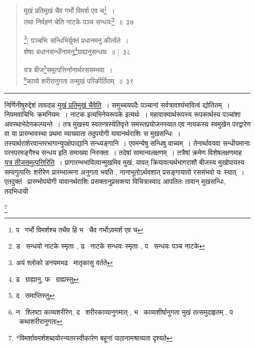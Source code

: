 \documentclass[11pt, openany]{book}
\newcommand\blfootnote[1]{%
 \begingroup
 \renewcommand\thefootnote{}\footnote{#1}%
 \addtocounter{footnote}{-1}%
 \endgroup
}
\begin{document}
\newpage

\begin{quote}
{\na मुखं प्रतिमुखं चैव गर्भो विमर्श एव च\renewcommand{\thefootnote}{1}\footnote{प \textendash\ गर्भो विमर्शश्च तथैव हि भ \textendash\ चैव गर्भोऽवमर्श एव च}~।\\
तथा निर्वहणं चेति नाटके पञ्च सन्धयः\renewcommand{\thefootnote}{2}\footnote{ड \textendash\ सन्धयो नाटके स्मृताः , ढ \textendash\ नाटके सन्धयः स्मृताः , प \textendash\ सन्धयः पञ्च नाटके}~॥~३७

\renewcommand{\thefootnote}{3}\footnote{अयं श्लोको डनयमभढ \textendash\ मातृकासु वर्तते}[ पञ्चभिः सन्धिभिर्युक्तं प्रधानमनु कीर्त्यते~।\\
शेषाः प्रधानसन्धीनामनु\renewcommand{\thefootnote}{4}\footnote{ढ \textendash\ ग्राह्यानु, फ \textendash\ ग्राह्यस्तु}ग्राह्यनुसन्धयः~॥ ]~३८

यत्र बीज\renewcommand{\thefootnote}{5}\footnote{द \textendash\ समाप्तिस्तु}समुत्पत्तिर्नानार्थरससम्भवा~।\\
\renewcommand{\thefootnote}{6}\footnote{न \textendash\ श्लिष्टा काव्यशरीरेण, द \textendash\ शरीरकाव्यानुगमात् , भ \textendash\ काव्यशीर्षानुगता मुखं तत्समुदाहृतम् , प \textendash\ कथाशरीरानुगता}काव्ये शरीरानुगता तन्मुखं परिकीर्तितम्~॥~३९}
\end{quote}

\hrule

\vspace{2mm}
\noindent
निर्णिनीषुरुद्देशं तावदाह \underline{मुखं प्रतिमुखं चैवेति}~। समुच्चयपदैः पञ्चानां सर्वत्रावश्यंभावित्वं द्योतितम्~। नियमवाचिभिः क्रमनियमः~। नाटक इत्यभिनेयरूपके इत्यर्थः~। महावाक्यार्थरूपस्य रूपकार्थस्य पञ्चांशा अवस्थाभेदेनकल्प्यन्ते~। तत्र मुखस्य स्वतन्त्रस्येतिवृत्ते समस्तप्रयोजनस्यात एव नायकस्य स्वमुखेन परद्वारेण वा या प्रारम्भावस्था प्रथमा व्याख्याता तदुपयोगी यावानर्थराशिः स मुखसन्धिः~। तस्यार्थराशेरवान्तरभागान्युपक्षेपाद्यानि सन्ध्यङ्गानि~। एवमन्येषु सन्धिषु वाच्यम्~। तेनार्थावयवा सन्धीयमानाः परस्परमङ्गैश्च सन्धय इति समाख्या निरुक्ता~। तदेषां सामान्यलक्षणम्~। तत्रैषां क्रमेण विशेषलक्षणमाह \underline{यत्र तीजसमुत्पत्तिरिति}~। प्रागारम्भभावित्वान्मुखमिव मुखं, यावत् क्रियावत्यर्थभागराशौ बीजस्य मुखोपायस्य सम्यगुत्पत्तिः शरीरेण प्रारम्भात्मना अनुगता भवति , नानाभूतोऽर्थवशात् प्रसङ्गायातो रससंभवो यः स्यात्~। एतदुक्तं \textendash\ प्रारम्भोपयोगी यावानर्थराशिः प्रसक्तानुप्रसक्त्या विचित्रास्वाद आपतितः तावान् मुखसन्धिः, तदभिधायी

\blfootnote{*विमर्शावमर्शशब्दयोरन्यतरस्वीकारेण बहूनां पाठानामश्राव्यता दृश्यते}
\end{document}
